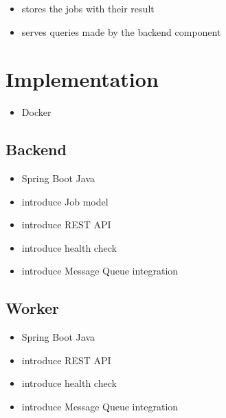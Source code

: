 \begin{itemize}
	\item stores the jobs with their result 
	\item serves queries made by the backend component
\end{itemize}

\section{Implementation}

\begin{itemize}
	\item Docker
\end{itemize}

\subsection{Backend}

\begin{itemize}
	\item Spring Boot Java
	\item introduce Job model
	\item introduce REST API
	\item introduce health check
	\item introduce Message Queue integration
\end{itemize}

\subsection{Worker}

\begin{itemize}
	\item Spring Boot Java
	\item introduce REST API
	\item introduce health check
	\item introduce Message Queue integration
\end{itemize}

